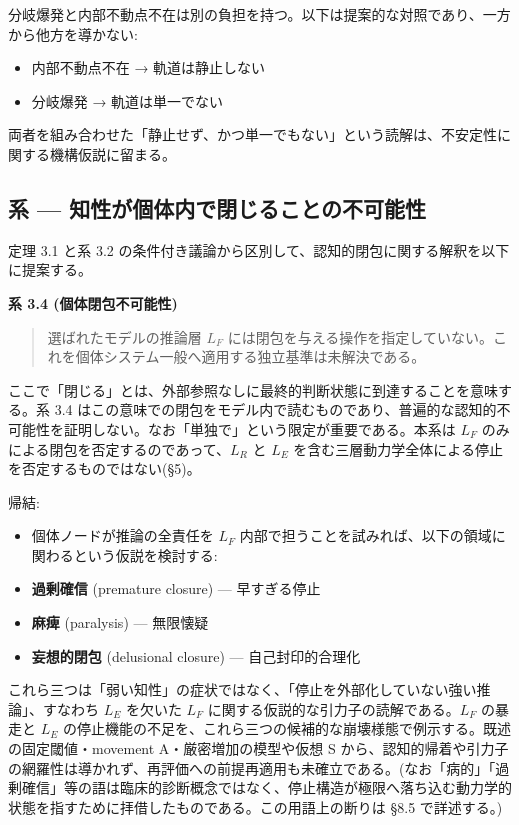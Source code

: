 分岐爆発と内部不動点不在は別の負担を持つ。以下は提案的な対照であり、一方から他方を導かない:
\begin{itemize}
\item 内部不動点不在 → 軌道は静止しない
\item 分岐爆発 → 軌道は単一でない
\end{itemize}


両者を組み合わせた「静止せず、かつ単一でもない」という読解は、不安定性に関する機構仮説に留まる。

\bigskip


\subsection{系 — 知性が個体内で閉じることの不可能性}


定理 3.1 と系 3.2 の条件付き議論から区別して、認知的閉包に関する解釈を以下に提案する。

\textbf{系 3.4 (個体閉包不可能性)}

\begin{quote}
選ばれたモデルの推論層 $L_F$ には閉包を与える操作を指定していない。これを個体システム一般へ適用する独立基準は未解決である。
\end{quote}


ここで「閉じる」とは、外部参照なしに最終的判断状態に到達することを意味する。系 3.4 はこの意味での閉包をモデル内で読むものであり、普遍的な認知的不可能性を証明しない。なお「単独で」という限定が重要である。本系は $L_F$ のみによる閉包を否定するのであって、$L_R$ と $L_E$ を含む三層動力学全体による停止を否定するものではない(\S{}5)。

帰結:

\begin{itemize}
\item 個体ノードが推論の全責任を $L_F$ 内部で担うことを試みれば、以下の領域に関わるという仮説を検討する:
\item \textbf{過剰確信} (premature closure) — 早すぎる停止
\item \textbf{麻痺} (paralysis) — 無限懐疑
\item \textbf{妄想的閉包} (delusional closure) — 自己封印的合理化
\end{itemize}


これら三つは「弱い知性」の症状ではなく、「停止を外部化していない強い推論」、すなわち $L_E$ を欠いた $L_F$ に関する仮説的な引力子の読解である。$L_F$ の暴走と $L_E$ の停止機能の不足を、これら三つの候補的な崩壊様態で例示する。既述の固定閾値・movement A・厳密増加の模型や仮想 S から、認知的帰着や引力子の網羅性は導かれず、再評価への前提再適用も未確立である。(なお「病的」「過剰確信」等の語は臨床的診断概念ではなく、停止構造が極限へ落ち込む動力学的状態を指すために拝借したものである。この用語上の断りは \S{}8.5 で詳述する。)

